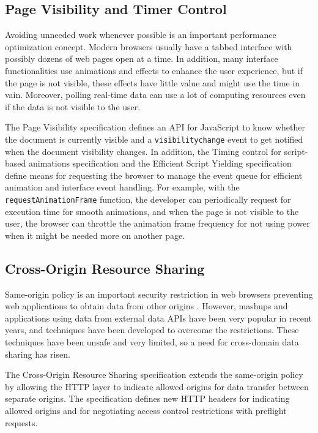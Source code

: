 \subsection{Page Visibility and Timer Control}

Avoiding unneeded work whenever possible is an important performance
optimization concept. Modern browsers usually have a tabbed interface
with possibly dozens of web pages open at a time. In addition, many
interface functionalities use animations and effects to enhance the
user experience, but if the page is not visible, these effects have
little value and might use the  time in vain. Moreover,
polling real-time data can use a lot of computing resources even if
the data is not visible to the user.

The Page Visibility specification \cite{PageVisibility} defines an API
for JavaScript to know whether the document is currently visible and a
\texttt{visibilitychange} event to get notified when the document
visibility changes. In addition, the Timing control for script-based
animations specification \cite{TimingControl} and the Efficient Script
Yielding specification \cite{ScriptYielding} define means for
requesting the browser to manage the event queue for efficient
animation and interface event handling. For example, with the
\texttt{requestAnimationFrame} function, the developer can
periodically request for execution time for smooth animations, and
when the page is not visible to the user, the browser can throttle the
animation frame frequency for not using  power when it might
be needed more on another page.

\subsection{Cross-Origin Resource Sharing}

Same-origin policy is an important security restriction in web
browsers preventing web applications to obtain data from other origins
\cite{CORS}. However, mashups and applications using data from
external data APIs have been very popular in recent years, and
techniques have been developed to overcome the restrictions. These
techniques have been unsafe and very limited, so a need for
cross-domain data sharing has risen.

The Cross-Origin Resource Sharing specification \cite{CORS} extends
the same-origin policy by allowing the HTTP layer to indicate allowed
origins for data transfer between separate origins. The specification
defines new HTTP headers for indicating allowed origins and for
negotiating access control restrictions with preflight requests.

